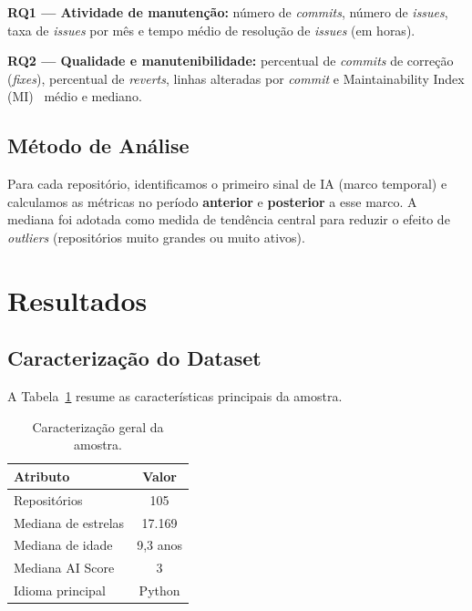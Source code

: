 \documentclass[12pt,a4paper,twocolumn]{article}
\begin{document}
\textbf{RQ1 --- Atividade de manutenção:}
número de \textit{commits}, número de \textit{issues}, taxa de \textit{issues} por mês
e tempo médio de resolução de \textit{issues} (em horas).

\textbf{RQ2 --- Qualidade e manutenibilidade:}
percentual de \textit{commits} de correção (\textit{fixes}), percentual de
\textit{reverts}, linhas alteradas por \textit{commit} e
Maintainability Index (MI)~\cite{oman1992maintainability} médio e mediano.

\subsection{Método de Análise}

Para cada repositório, identificamos o primeiro sinal de IA (marco temporal) e
calculamos as métricas no período \textbf{anterior} e \textbf{posterior} a esse marco.
A mediana foi adotada como medida de tendência central para reduzir o efeito de
\textit{outliers} (repositórios muito grandes ou muito ativos).

\section{Resultados}

\subsection{Caracterização do Dataset}

A Tabela~\ref{tab:dataset} resume as características principais da amostra.

\begin{table}[H]
\centering
\caption{Caracterização geral da amostra.}
\label{tab:dataset}
\small
\begin{tabular}{lc}
\toprule
\textbf{Atributo} & \textbf{Valor} \\
\midrule
Repositórios         & 105 \\
Mediana de estrelas  & 17.169 \\
Mediana de idade     & 9,3 anos \\
Mediana AI Score     & 3 \\
Idioma principal     & Python \\
\bottomrule
\end{tabular}
\end{table}
\end{document}
